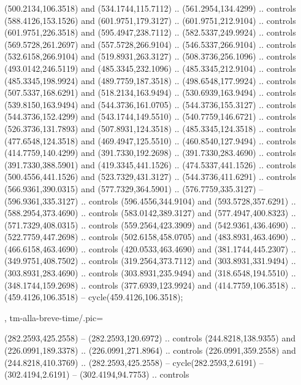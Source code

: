{{\begin{scope}[y=-0.80pt,x=0.80pt,scale=0.04,yshift=230pt,xshift=-360pt]
      (500.2134,106.3518) and (534.1744,115.7112) .. (561.2954,134.4299) .. controls
      (588.4126,153.1526) and (601.9751,179.3127) .. (601.9751,212.9104) .. controls
      (601.9751,226.3518) and (595.4947,238.7112) .. (582.5337,249.9924) .. controls
      (569.5728,261.2697) and (557.5728,266.9104) .. (546.5337,266.9104) .. controls
      (532.6158,266.9104) and (519.8931,263.3127) .. (508.3736,256.1096) .. controls
      (493.0142,246.5119) and (485.3345,232.1096) .. (485.3345,212.9104) .. controls
      (485.3345,198.9924) and (489.7759,187.3518) .. (498.6548,177.9924) .. controls
      (507.5337,168.6291) and (518.2134,163.9494) .. (530.6939,163.9494) .. controls
      (539.8150,163.9494) and (544.3736,161.0705) .. (544.3736,155.3127) .. controls
      (544.3736,152.4299) and (543.1744,149.5510) .. (540.7759,146.6721) .. controls
      (526.3736,131.7893) and (507.8931,124.3518) .. (485.3345,124.3518) .. controls
      (477.6548,124.3518) and (469.4947,125.5510) .. (460.8540,127.9494) .. controls
      (414.7759,140.4299) and (391.7330,192.2698) .. (391.7330,283.4690) .. controls
      (391.7330,388.5901) and (419.3345,441.1526) .. (474.5337,441.1526) .. controls
      (500.4556,441.1526) and (523.7329,431.3127) .. (544.3736,411.6291) .. controls
      (566.9361,390.0315) and (577.7329,364.5901) .. (576.7759,335.3127) --
      (596.9361,335.3127) .. controls (596.4556,344.9104) and (593.5728,357.6291) ..
      (588.2954,373.4690) .. controls (583.0142,389.3127) and (577.4947,400.8323) ..
      (571.7329,408.0315) .. controls (559.2564,423.3909) and (542.9361,436.4690) ..
      (522.7759,447.2698) .. controls (502.6158,458.0705) and (483.8931,463.4690) ..
      (466.6158,463.4690) .. controls (420.0533,463.4690) and (381.1744,445.2307) ..
      (349.9751,408.7502) .. controls (319.2564,373.7112) and (303.8931,331.9494) ..
      (303.8931,283.4690) .. controls (303.8931,235.9494) and (318.6548,194.5510) ..
      (348.1744,159.2698) .. controls (377.6939,123.9924) and (414.7759,106.3518) ..
      (459.4126,106.3518) -- cycle(459.4126,106.3518);
    \end{scope}
  },
  tm-alla-breve-time/.pic={
    \begin{scope}[y=-0.80pt,x=0.80pt,scale=0.04,yshift=215pt,xshift=-235pt]
       (282.2593,425.2558) -- (282.2593,120.6972) ..
      controls (244.8218,138.9355) and (226.0991,189.3378) .. (226.0991,271.8964) ..
      controls (226.0991,359.2558) and (244.8218,410.3769) .. (282.2593,425.2558) --
      cycle(282.2593,2.6191) -- (302.4194,2.6191) -- (302.4194,94.7753) .. controls

\end{scope}}}
